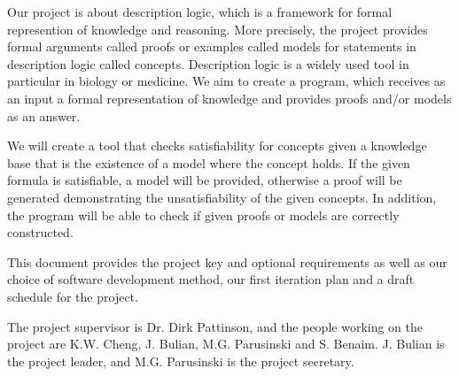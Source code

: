 Our project is about description logic, which is a framework for formal represention of knowledge and reasoning. More precisely, the project provides formal arguments called proofs or examples called models for statements in description logic called concepts. Description logic is a widely used tool in particular in biology or medicine. We aim to create a program,
which receives as an input a formal representation of knowledge and provides proofs and/or models as an answer. 

We will create a tool that checks satisfiability for concepts given a knowledge base that is the existence of a model where the concept holds. If the given formula is satisfiable, a model will be provided, otherwise a proof will be generated demonstrating the unsatisfiability of the given concepts. In addition, the program will be able to check if given proofs or models are correctly constructed.

This document provides the project key and optional requirements as well as our choice of software development method, our first iteration plan and a draft schedule for the project.

The project supervisor is Dr. Dirk Pattinson, and the people working on the project
are K.W. Cheng, J. Bulian, M.G. Parusinski and S. Benaim. J. Bulian is the project leader, and M.G. Parusinski is the project secretary.
